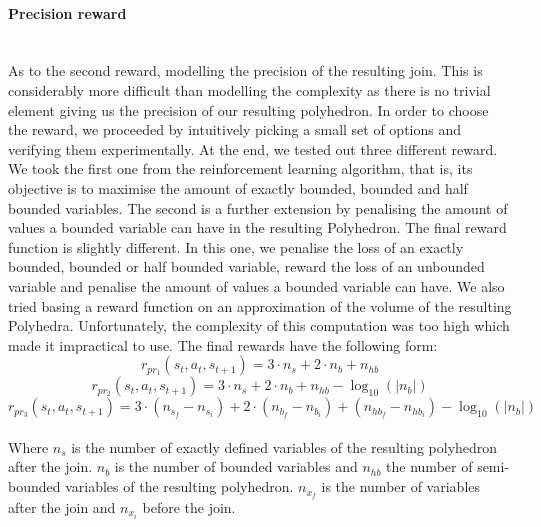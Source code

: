\paragraph{Precision reward}\mbox{}\\
As to the second reward, modelling the precision of the resulting join. This is considerably more difficult than modelling the complexity as there is no trivial element giving us the precision of our resulting polyhedron. In order to choose the reward, we proceeded by intuitively picking a small set of options and verifying them experimentally. At the end, we tested out three different reward.\\
We took the first one from the reinforcement learning algorithm, that is, its objective is to maximise the amount of exactly bounded, bounded and half bounded variables. The second is a further extension by penalising the amount of values a bounded variable can have in the resulting Polyhedron. The final reward function is slightly different. In this one, we penalise the loss of an exactly bounded, bounded or half bounded variable, reward the loss of an unbounded variable and penalise the amount of values a bounded variable can have. We also tried basing a reward function on an approximation of the volume of the resulting Polyhedra. Unfortunately, the complexity of this computation was too high which made it impractical to use. The final rewards have the following form:
\begin{equation}
		r_{pr_1}(s_t,a_t,s_{t+1}) = 3  \cdot n_s + 2 \cdot n_b + n_{hb}
\end{equation}
\begin{equation}
		r_{pr_2}(s_t,a_t,s_{t+1}) = 3  \cdot n_s + 2 \cdot n_b + n_{hb} - \log_{10}(|n_b|)
\end{equation}
\begin{equation}
		r_{pr_3}(s_t,a_t,s_{t+1}) = 3  \cdot (n_{s_f} - n_{s_i}) + 2 \cdot (n_{b_f} - n_{b_i}) + (n_{hb_f} - n_{hb_i}) - \log_{10}(|n_b|)
\end{equation}\mbox{}\\
Where $n_s$ is the number of exactly defined variables of the resulting polyhedron after the join. $n_b$ is the number of bounded variables and $n_{hb}$ the number of semi-bounded variables of the resulting polyhedron. $n_{x_f}$ is the number of variables after the join and $n_{x_i}$ before the join.
